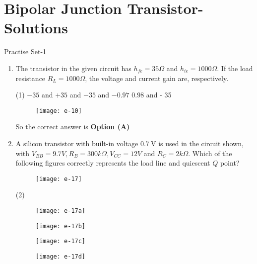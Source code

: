 \chapter{Bipolar Junction Transistor-Solutions}
\begin{abox}
	Practise Set-1
\end{abox}
\begin{enumerate}
	\item The transistor in the given circuit has $h_{f e}=35 \Omega$ and $h_{i e}=1000 \Omega$. If the load resistance $R_{L}=1000 \Omega$, the voltage and current gain are, respectively.
{	}
\begin{tasks}(1)
	\task[\textbf{A.}] $-35$ and $+35$
	 and $-35$
	 and $-0.97$
	\task[\textbf{D.}]  $0.98$ and - 35
\end{tasks}
\begin{figure}[H]
	\centering
	\texttt{[image: e-10]}
\end{figure}
\begin{answer}
So the correct answer is \textbf{Option (A)}
\end{answer}
	\item A silicon transistor with built-in voltage $0.7 \mathrm{~V}$ is used in the circuit shown, with $V_{B B}=9.7 V, R_{B}=300 k \Omega, V_{C C}=12 V$ and $R_{C}=2 k \Omega$. Which of the following figures correctly represents the load line and quiescent $Q$ point?
{	}
\begin{figure}[H]
\centering
\texttt{[image: e-17]}
\end{figure}
\begin{tasks}(2)
\task[\textbf{A.}] \begin{figure}[H]
	\centering
	\texttt{[image: e-17a]}
\end{figure}
\task[\textbf{B.}] \begin{figure}[H]
	\centering
	\texttt{[image: e-17b]}
\end{figure}
\task[\textbf{C.}] \begin{figure}[H]
	\centering
	\texttt{[image: e-17c]}
\end{figure}
\task[\textbf{D.}] \begin{figure}[H]
	\centering
	\texttt{[image: e-17d]}
\end{figure}
\end{tasks}

\end{enumerate}
